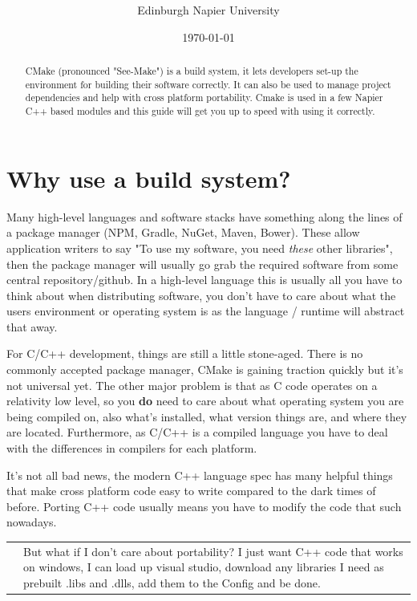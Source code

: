 \documentclass[11pt, a4paper]{article}
\title{\textbf{\mytitle}}
\author{Edinburgh Napier University}
\date{\today}
\begin{document}
	 \onecolumn
\maketitle
   
    \begin{abstract}
        CMake (pronounced "See-Make") is a build system, it lets developers set-up the environment for building their software correctly. It can also be used to manage project dependencies and help with cross platform portability. Cmake is used in a few Napier C++ based modules and this guide will get you up to speed with using it correctly.
    \end{abstract}
    
    \section{Why use a build system?}
	Many high-level languages and software stacks have something along the lines of a package manager (NPM, Gradle, NuGet, Maven, Bower). These allow application writers to say "To use my software, you need \textit{these} other libraries", then the package manager will usually go grab the required software from some central repository/github. In a high-level language this is usually all you have to think about when distributing software, you don't have to care about what the users environment or operating system is as the language / runtime will abstract that away.

    For C/C++ development, things are still a little stone-aged. There is no commonly accepted package manager, CMake is gaining traction quickly but it's not universal yet. The other major problem is that as C code operates on a relativity low level, so you \textbf{do} need to care about what operating system you are being compiled on, also what's installed, what version things are, and where they are located. Furthermore, as C/C++ is a compiled language you have to deal with the differences in compilers for each platform.
    
    It's not all bad news, the modern C++ language spec has many helpful things that make cross platform code easy to write compared to the dark times of before. Porting C++ code usually means you have to modify the code that such nowadays.
    
	\begin{tabular}{l|p{}}
		&But what if I don't care about portability? I just want C++ code that works on windows,
		I can load up visual studio, download any libraries I need as prebuilt .libs and .dlls, add them to the Config and be done.
	\end{tabular}
	
\end{document}
